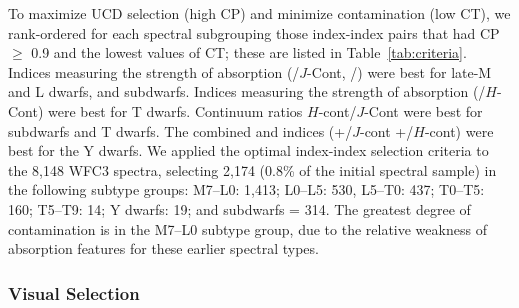 \documentclass[manuscript]{aastex63}
\begin{document}
To maximize UCD selection (high CP) and minimize contamination (low CT), we rank-ordered for each spectral subgrouping those index-index pairs that had CP $\geq$ 0.9 and the lowest values of CT; these are listed in Table~\ref{tab:criteria}.
Indices measuring the strength of {\wat} absorption (/$J$-Cont, /) were best for late-M and L dwarfs, and subdwarfs. 
Indices measuring the strength of {\meth} absorption (\indxmeth/$H$-Cont) were best for T dwarfs. 
Continuum ratios $H$-cont/$J$-Cont were best for subdwarfs and T dwarfs. 
The combined \wat and \meth indices (+\indxmeth/$J$-cont +\indxmeth/$H$-cont) were best for the Y dwarfs.
We applied the optimal index-index selection criteria to the 8,148 WFC3 spectra, selecting 2,174 (0.8\% of the initial spectral sample) in the following subtype groups: M7--L0: 1,413; L0--L5: 530, L5--T0: 437; T0--T5: 160; T5--T9: 14; Y dwarfs: 19; and subdwarfs = 314. The greatest degree of contamination is in the M7--L0 subtype group, due to the relative weakness of absorption features for these earlier spectral types. 

\subsubsection{Visual Selection}
\end{document}
